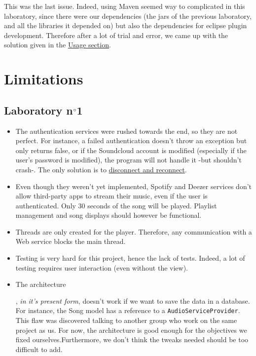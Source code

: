 \documentclass{report}
\begin{document}
This was the last issue. Indeed, using Maven seemed way to complicated in this laboratory, since there were our dependencies (the jars of the previous laboratory, and all the libraries it depended on) but also the dependencies for eclipse plugin development. Therefore after a lot of trial and error, we came up with the solution given in the \hyperref[Usage::lab2]{Usage section}.

\chapter{Limitations}

\section{Laboratory n$\degree$1}
\begin{itemize}
\item The authentication services were rushed towards the end, so they are not perfect. For instance, a failed authentication doesn't throw an exception but only returns false, or if the Soundcloud account is modified (especially if the user's password is modified), the program will not handle it -but shouldn't crash-. The only solution is to \href{http://img.pandawhale.com/post-16780-have-you-tried-forcing-an-unex-uQSY.gif}{disconnect and reconnect}. 
\item Even though they weren't yet implemented, Spotify and Deezer services don't allow third-party apps to stream their music, even if the user is authenticated. Only 30 seconds of the song will be played. Playlist management and song displays should however be functional.
\item Threads are only created for the player. Therefore, any communication with a Web service blocks the main thread.
\item Testing is very hard for this project, hence the lack of tests. Indeed, a lot of testing requires user interaction (even without the view).
\item \hypertarget{db}{The architecture}, \textit{in it's present form}, doesn't work if we want to save the data in a database. For instance, the Song model has a reference to a \texttt{AudioServiceProvider}. This flaw was discovered talking to another group who work on the same project as us. For now, the architecture is good enough for the objectives we fixed ourselves.Furthermore, we don't think the tweaks needed should be too difficult to add.
\end{itemize}
\end{document}
